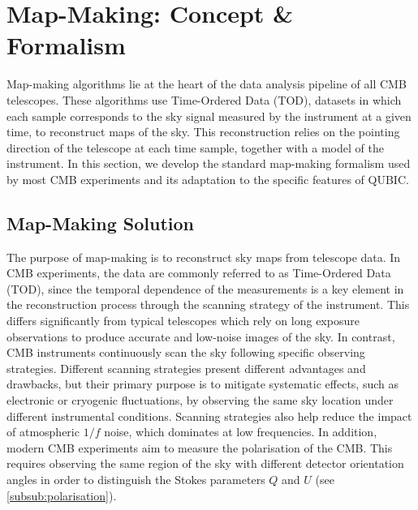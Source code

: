 \documentclass[../../thesis.tex]{subfiles}
\begin{document}

\section{Map-Making: Concept \& Formalism} \label{section:mapmaking}

Map-making algorithms lie at the heart of the data analysis pipeline of all CMB telescopes. These algorithms use Time-Ordered Data (TOD), datasets in which each sample corresponds to the sky signal measured by the instrument at a given time, to reconstruct maps of the sky. This reconstruction relies on the pointing direction of the telescope at each time sample, together with a model of the instrument. In this section, we develop the standard map-making formalism used by most CMB experiments and its adaptation to the specific features of QUBIC.

\subsection{Map-Making Solution} \label{sub:mm_solution}

The purpose of map-making is to reconstruct sky maps from telescope data. In CMB experiments, the data are commonly referred to as Time-Ordered Data (TOD), since the temporal dependence of the measurements is a key element in the reconstruction process through the scanning strategy of the instrument. This differs significantly from typical telescopes which rely on long exposure observations to produce accurate and low-noise images of the sky. In contrast, CMB instruments continuously scan the sky following specific observing strategies. Different scanning strategies present different advantages and drawbacks, but their primary purpose is to mitigate systematic effects, such as electronic or cryogenic fluctuations, by observing the same sky location under different instrumental conditions. Scanning strategies also help reduce the impact of atmospheric $1/f$ noise, which dominates at low frequencies. In addition, modern CMB experiments aim to measure the polarisation of the CMB. This requires observing the same region of the sky with different detector orientation angles in order to distinguish the Stokes parameters $Q$ and $U$ (see \ref{subsub:polarisation}).
\end{document}

